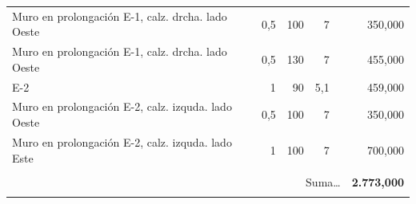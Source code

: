 \documentclass{book}%
\begin{document}
\begin{longtable}{lrrrrr}
\multicolumn{1}{p{3.5cm}}{Muro en prolongación E{-}1, calz. drcha. lado Oeste}&0,5&100&7&&   350,000\\%
\multicolumn{1}{p{3.5cm}}{Muro en prolongación E{-}1, calz. drcha. lado Oeste}&0,5&130&7&&   455,000\\%
\multicolumn{1}{p{3.5cm}}{E{-}2}&1&90&5,1&&   459,000\\%
\multicolumn{1}{p{3.5cm}}{Muro en prolongación E{-}2, calz. izquda. lado Oeste}&0,5&100&7&&   350,000\\%
\multicolumn{1}{p{3.5cm}}{Muro en prolongación E{-}2, calz. izquda. lado Este}&1&100&7&&   700,000\\%
&&&&&\\%
\multicolumn{5}{r}{Suma\ldots}&\textbf{ 2.773,000}\\%
\hline%
&&&&&\\%
\end{longtable}%
\newpage

%
\end{document}
